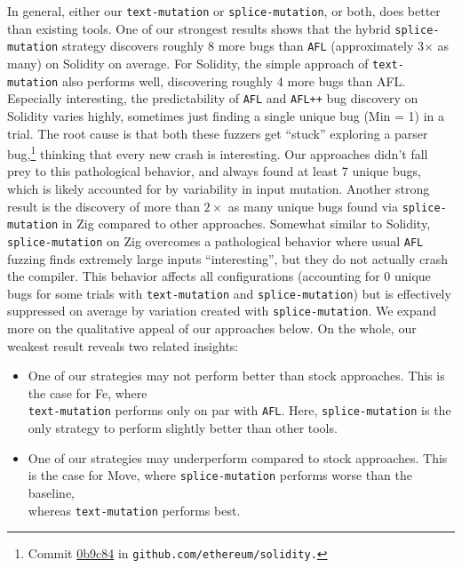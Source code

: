 \begin{sloppypar}
In general, either our \texttt{text-mutation} or \texttt{splice-mutation}, or
both, does better than existing tools. One of our strongest results shows that the
hybrid \texttt{splice-mutation} strategy discovers roughly 8 more bugs than
\texttt{AFL} (approximately 3$\times$ as many) on Solidity on average. For Solidity,
the simple approach of \texttt{text-mutation} also performs well, discovering
roughly 4 more bugs than AFL. Especially interesting, the predictability of
\texttt{AFL} and \texttt{AFL++} bug discovery on Solidity varies highly,
sometimes just finding a single unique bug (Min = 1) in a trial. The root cause
is that both these fuzzers get ``stuck'' exploring a parser
bug,\footnote{Commit
\href{https://github.com/ethereum/solidity/commit/0b9c842656c644c209280e5f570f94dee77a1606}{0b9c84}
in \texttt{github.com/ethereum/solidity.}} thinking that every new crash is
interesting. Our approaches didn't fall prey to this pathological behavior, and
always found at least 7 unique bugs, which is likely accounted for by
variability in input mutation. Another strong result is the discovery of more than $2\times$
as many unique bugs found via \texttt{splice-mutation} in Zig compared to other approaches.
Somewhat similar to Solidity, \texttt{splice-mutation} on Zig overcomes
a pathological behavior where usual \texttt{AFL} fuzzing finds
extremely large inputs ``interesting'', but they do not actually crash
the compiler. This behavior affects all configurations (accounting for 0 unique bugs for some trials with \texttt{text-mutation} and \texttt{splice-mutation}) but is effectively suppressed on average by variation created with \texttt{splice-mutation}. We expand more on the qualitative appeal of our approaches below.
On the whole, our weakest result reveals two related
insights:
\end{sloppypar}

\begin{itemize}
\item One of our strategies may not perform better than stock approaches. This is the case for Fe, where \\ \texttt{text-mutation} performs only on par with \texttt{AFL}. Here, \texttt{splice-mutation} is the only strategy to perform slightly better than other tools.
\item One of our strategies may underperform compared to stock approaches. This is the case for Move, where \texttt{splice-mutation} performs worse than the baseline, \\ whereas \texttt{text-mutation} performs best.
\end{itemize}

